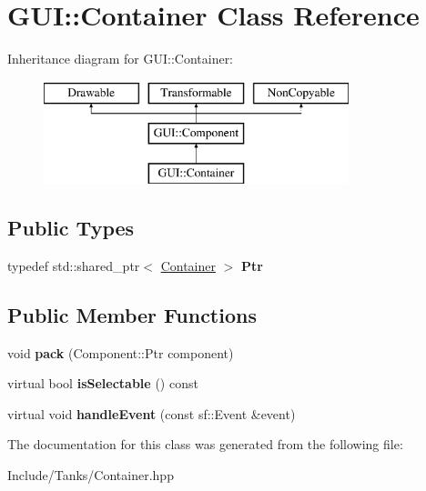 \hypertarget{class_g_u_i_1_1_container}{}\section{G\+U\+I\+:\+:Container Class Reference}
\label{class_g_u_i_1_1_container}
Inheritance diagram for G\+U\+I\+:\+:Container\+:\begin{figure}[H]
\begin{center}
\leavevmode
\includegraphics[height=3.000000cm]{class_g_u_i_1_1_container}
\end{center}
\end{figure}
\subsection*{Public Types}
\begin{DoxyCompactItemize}
\item 
\hypertarget{class_g_u_i_1_1_container_aff900329cc0dbef99abdd1c95175823a}{}typedef std\+::shared\+\_\+ptr$<$ \hyperlink{class_g_u_i_1_1_container}{Container} $>$ {\bfseries Ptr}\label{class_g_u_i_1_1_container_aff900329cc0dbef99abdd1c95175823a}

\end{DoxyCompactItemize}
\subsection*{Public Member Functions}
\begin{DoxyCompactItemize}
\item 
\hypertarget{class_g_u_i_1_1_container_a96138fff70a580a2c0184347be95c74c}{}void {\bfseries pack} (Component\+::\+Ptr component)\label{class_g_u_i_1_1_container_a96138fff70a580a2c0184347be95c74c}

\item 
\hypertarget{class_g_u_i_1_1_container_aacc4f2be899907bd6b03e28dd229fac2}{}virtual bool {\bfseries is\+Selectable} () const \label{class_g_u_i_1_1_container_aacc4f2be899907bd6b03e28dd229fac2}

\item 
\hypertarget{class_g_u_i_1_1_container_adc3b4318b7cb683482f0d0de5b1431d3}{}virtual void {\bfseries handle\+Event} (const sf\+::\+Event \&event)\label{class_g_u_i_1_1_container_adc3b4318b7cb683482f0d0de5b1431d3}

\end{DoxyCompactItemize}


The documentation for this class was generated from the following file\+:\begin{DoxyCompactItemize}
\item 
Include/\+Tanks/Container.\+hpp\end{DoxyCompactItemize}
